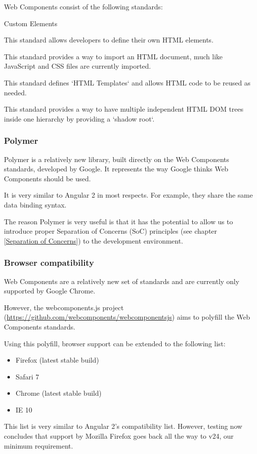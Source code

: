 Web Components consist of the following standards:
\begin{labeling}{Custom Elements}
\item [Custom Elements] This standard allows developers to define their own
HTML elements.
\item [HTML Imports] This standard provides a way to import an HTML document,
much like JavaScript and CSS files are currently imported.
\item [Templates] This standard defines `HTML Templates` and allows HTML code to
be reused as needed.
\item [Shadow DOM] This standard provides a way to have multiple independent
HTML DOM trees inside one hierarchy by providing a `shadow root`.
\end{labeling}

\subsubsection{Polymer}
Polymer is a relatively new library, built directly on the Web Components
standards, developed by Google. It represents the way Google thinks Web
Components should be used.

It is very similar to Angular 2 in most respects. For example, they share the
same data binding syntax.

The reason Polymer is very useful is that it has the potential
to allow us to introduce proper Separation of Concerns (SoC) principles
(see chapter \ref{Separation of Concerns}) to the development environment.

\subsubsection{Browser compatibility}
Web Components are a relatively new set of standards and are currently only
supported by Google Chrome.

However, the webcomponents.js project (\url{https://github.com/webcomponents/webcomponentsjs})
aims to polyfill the Web Components standards.

Using this polyfill, browser support can be extended to the following list:
\begin{itemize}[noitemsep]
\item Firefox (latest stable build)
\item Safari 7
\item Chrome (latest stable build)
\item IE 10
\end{itemize}
This list is very similar to Angular 2's compatibility list. However, testing
now concludes that support by Mozilla Firefox goes back all the way to v24, our
minimum requirement.


